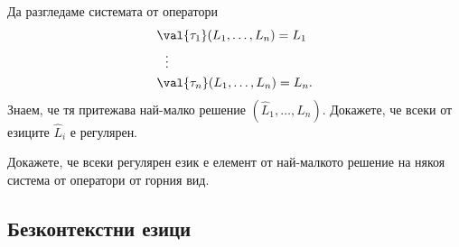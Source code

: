 \begin{problem}
  Да разгледаме системата от оператори
  \begin{align*}
    & \val{\tau_1}(L_1,\dots,L_n) = L_1\\
    & \ \ \vdots\\
    & \val{\tau_n}(L_1,\dots,L_n) = L_n.
  \end{align*}
  Знаем, че тя притежава най-малко решение $(\hat{L}_1,\dots,\hat{L}_n)$.
  Докажете, че всеки от езиците $\hat{L}_i$ е регулярен.

  Докажете, че всеки регулярен език е елемент от най-малкото решение 
  на някоя система от оператори от горния вид.
\end{problem}








\subsection{Безконтекстни езици}

